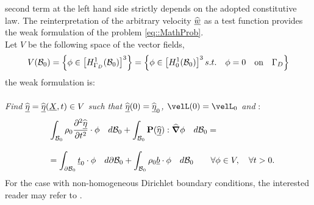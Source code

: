 second term at the left hand side strictly depends on the adopted
constitutive law. The reinterpretation of the arbitrary velocity
$\widehat{\underline{w}}$ as a test function provides the weak formulation of the
problem \eqref{eq::MathProb}.\\ Let $V$ be the following space of the
vector fields,
\begin{equation}
V(\mathcal{B}_0)=\left\{\phi\in\left[H_{\Gamma_D}^1(\mathcal{B}_0)\right]^3\right\}=\left\{\phi\in\left[H_{0}^1(\mathcal{B}_0)\right]^3
s.t. \quad \phi=0 \quad\text{on}\quad\Gamma_D\right\}
  \label{eq::TestSpace}
\end{equation} the weak formulation is:\\ \\ \textit{Find
$\widehat{\underline{\eta}}=\widehat{\underline{\eta}}(\underline{X},t)\in V$ such that $\widehat{\underline{\eta}}(0)=\widehat{\underline{\eta}}_0$,
$\velL(0)=\velL_0$ and} :
\begin{equation}
  \begin{array}{lll} & \displaystyle
\int_{\mathcal{B}_0}\rho_0\frac{\partial^2 \widehat{\underline{\eta}}}{\partial
t^2}\cdot\phi\quad d\mathcal{B}_0 +
\int_{\mathcal{B}_0}\textbf{P}(\widehat{\underline{\eta}}):\widehat{\boldsymbol{\nabla}}\phi\quad d\mathcal{B}_0 = \\ \\ &
\displaystyle = \int_{\partial \mathcal{B}_0}\underline{t}_0\cdot\phi\quad
d\partial\mathcal{B}_0 + \int_{\mathcal{B}_0}\rho_0 \underline{b}\cdot\phi\quad
d\mathcal{B}_0 \qquad \forall \phi\in V, \quad \forall t>0.
    \end{array}
  \label{eq::WF}
\end{equation} For the case with non-homogeneous Dirichlet boundary
conditions, the interested reader may refer to \cite{Hughes}.

